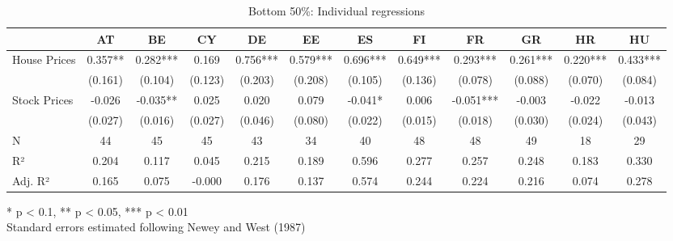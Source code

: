 \begin{table}[h]
\caption{Bottom 50\%: Individual regressions} 
\fontsize{7.5pt}{9.0pt}\selectfont
\begin{tabular*}{\linewidth}{@{\extracolsep{\fill}}lccccccccccc}
\toprule
  & AT & BE & CY & DE & EE & ES & FI & FR & GR & HR & HU \\ 
\midrule\addlinespace[2.5pt]
House Prices & 0.357** & 0.282*** & 0.169 & 0.756*** & 0.579*** & 0.696*** & 0.649*** & 0.293*** & 0.261*** & 0.220*** & 0.433*** \\ 
 & (0.161) & (0.104) & (0.123) & (0.203) & (0.208) & (0.105) & (0.136) & (0.078) & (0.088) & (0.070) & (0.084) \\ 
Stock Prices & -0.026 & -0.035** & 0.025 & 0.020 & 0.079 & -0.041* & 0.006 & -0.051*** & -0.003 & -0.022 & -0.013 \\ 
{} & {(0.027)} & {(0.016)} & {(0.027)} & {(0.046)} & {(0.080)} & {(0.022)} & {(0.015)} & {(0.018)} & {(0.030)} & {(0.024)} & {(0.043)} \\ 
N & 44 & 45 & 45 & 43 & 34 & 40 & 48 & 48 & 49 & 18 & 29 \\ 
R² & 0.204 & 0.117 & 0.045 & 0.215 & 0.189 & 0.596 & 0.277 & 0.257 & 0.248 & 0.183 & 0.330 \\ 
Adj. R² & 0.165 & 0.075 & -0.000 & 0.176 & 0.137 & 0.574 & 0.244 & 0.224 & 0.216 & 0.074 & 0.278 \\ 
\bottomrule
\end{tabular*}
\begin{minipage}{\linewidth}
* p < 0.1, ** p < 0.05, *** p < 0.01\\
Standard errors estimated following Newey and West (1987)\\
\end{minipage}
\end{table}

